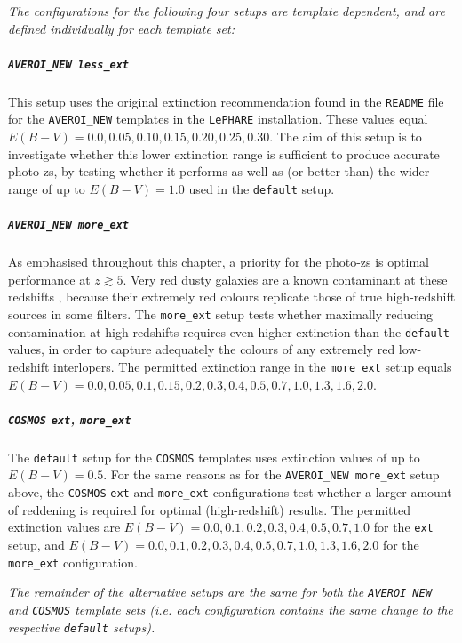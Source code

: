 {\vspace{1em plus 0.2em minus 0.1em}}
\textit{The configurations for the following four setups are template dependent, and are defined individually for each template set:} \par

\subparagraph{\texttt{AVEROI\_NEW less\_ext}} This setup uses the original extinction recommendation found in the \texttt{README} file for the \texttt{AVEROI\_NEW} templates in the \texttt{LePHARE} installation. These values equal $E(B-V)=0.0,0.05,0.10,0.15,0.20,0.25,0.30$. The aim of this setup is to investigate whether this lower extinction range is sufficient to produce accurate photo-zs, by testing whether it performs as well as (or better than) the wider range of up to $E(B-V)=1.0$ used in the \texttt{default} setup. 

\subparagraph{\texttt{AVEROI\_NEW more\_ext}} As emphasised throughout this chapter, a priority for the \DESVIDEO photo-zs is optimal performance at $z\gtrsim5$. Very red dusty galaxies are a known contaminant at these redshifts \citep{2016PASA...33...37F}, because their extremely red colours replicate those of true high-redshift sources in some filters. The \texttt{more\_ext} setup tests whether maximally reducing contamination at high redshifts requires even higher extinction than the \texttt{default} values, in order to capture adequately the colours of any extremely red low-redshift interlopers. The permitted extinction range in the \texttt{more\_ext} setup equals $E(B-V) = 0.0, 0.05, 0.1, 0.15, 0.2, 0.3, 0.4, 0.5, 0.7, 1.0, 1.3, 1.6, 2.0$. 

\subparagraph{\texttt{COSMOS} \texttt{ext}, \texttt{more\_ext}} The \texttt{default} setup for the \texttt{COSMOS} templates uses extinction values of up to $E(B-V)=0.5$. For the same reasons as for the \texttt{AVEROI\_NEW more\_ext} setup above, the \texttt{COSMOS} \texttt{ext} and \texttt{more\_ext} configurations test whether a larger amount of reddening is required for optimal (high-redshift) results. The permitted extinction values are $E(B-V)=0.0,\allowbreak 0.1,\allowbreak 0.2,\allowbreak 0.3,\allowbreak 0.4,\allowbreak 0.5,\allowbreak 0.7,\allowbreak 1.0$ for the \texttt{ext} setup, and $E(B-V)=0.0,\allowbreak 0.1,\allowbreak 0.2,\allowbreak 0.3,\allowbreak 0.4,\allowbreak 0.5,\allowbreak 0.7,\allowbreak 1.0,\allowbreak 1.3,\allowbreak 1.6,\allowbreak 2.0$ for the \texttt{more\_ext} configuration. \par

{\vspace{1.2em plus 0.2em minus 0.1em}}\textit{The remainder of the alternative setups are the same for both the \textup{\texttt{AVEROI\_NEW}} and \textup{\texttt{COSMOS}} template sets (i.e. each configuration contains the same change to the respective \textup{\texttt{default}} setups).} \par


